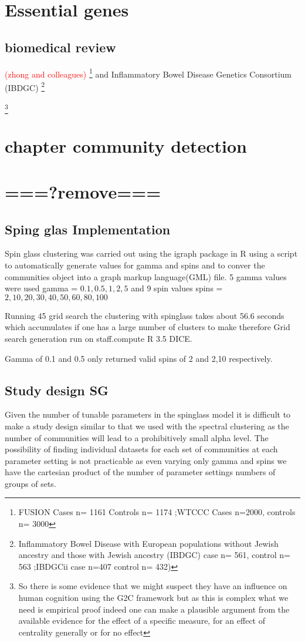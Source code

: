 \section{Essential genes}
\subsection{biomedical review}


\textcolor{red}{(zhong and colleagues)}\cite{zhong2013prediction}
\footnote{ FUSION  Cases n=	1161 Controls n=	1174 ;WTCCC Cases n=2000, controls n= 3000 } and Inflammatory Bowel Disease Genetics Consortium (IBDGC) \footnote{Inflammatory Bowel Disease   with European populations without Jewish ancestry and those with Jewish ancestry (IBDGC) case n=	561, control n=	563 ;IBDGCii case n=407 control n=	432)}

\footnote{ So there is some evidence that we might suspect they have an influence on human cognition using the G2C framework but as this is complex what we need is empirical proof indeed one can make a plausible argument from the available evidence for the effect of a specific measure, for an effect of centrality generally or for no effect}
\section{chapter community detection}

\section{===?remove===}

\subsection{Sping glas Implementation}
Spin glass clustering was carried out using the igraph package in R using a script to automatically generate values for gamma and spins and to conver the communities object into a graph markup language(GML) file. 5 gamma values were used gamma = $0.1,0.5,1,2,5$ and 9 spin values spins = $2,10,20,30,40,50,60,80,100$ 

Running 45 grid search the clustering with spinglass takes about 56.6 seconds which accumulates if one has a large number of clusters to make therefore Grid search generation run on staff.compute R 3.5 DICE.

Gamma of 0.1 and 0.5 only returned valid spins of 2 and 2,10 respectively. 
\subsection{Study design SG}
Given the number of tunable parameters in the spinglass model it is difficult to make a study design similar to that we used with the spectral clustering as the number of communities will lead to a prohibitively small alpha level. The possibility of finding individual datasets for each set of communities at each parameter setting is not practicable as even varying only gamma and spins we have the cartesian product of the number of parameter settings numbers of groups of sets.

